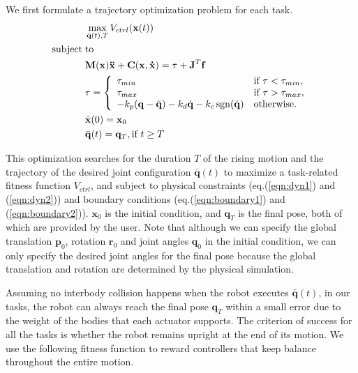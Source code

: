 We first formulate a trajectory optimization problem for each task.
\begin{align}
 \label{eqn:obj}&\max_{\bar{\mathbf{q}}(t),T} V_{ctrl}(\mathbf{x}(t))\\
\nonumber  \mathrm{subject\;} &\mathrm{to} \\
\label{eqn:dyn1} & \mathbf{M}(\mathbf{x})\mathbf{\ddot{x}}+\mathbf{C}(\mathbf{x},\mathbf{\dot{x}}) =\tau + \mathbf{J}^T\mathbf{f}\\
\label{eqn:dyn2} &\tau =
  \left\{
    \begin{array}{ll}
      \tau_{min} & \text{if }\tau < \tau_{min},\\
      \tau_{max} & \text{if }\tau > \tau_{max},\\
      -k_p(\mathbf{q}-\bar{\mathbf{q}}) - k_d\dot{\mathbf{q}} - k_c\operatorname{sgn}(\dot{\mathbf{q}}) & \text{otherwise.}\\
    \end{array}
  \right.\\
\label{eqn:boundary1}&\bar{\mathbf{x}}(0) = \mathbf{x}_0\\
\label{eqn:boundary2}&\bar{\mathbf{q}}(t) = \mathbf{q}_T, \text{if } t \geq T
\end{align}

This optimization searches for the duration $T$ of the rising motion and the trajectory of the desired joint configuration $\bar{\mathbf{q}}(t)$ to maximize a task-related fitness function $V_{ctrl}$, and subject to physical constraints (eq.(\ref{eqn:dyn1}) and (\ref{eqn:dyn2})) and boundary conditions (eq.(\ref{eqn:boundary1}) and (\ref{eqn:boundary2})). $\mathbf{x}_0$ is the initial condition, and $\mathbf{q}_T$ is the final pose, both of which are provided by the user. Note that although we can specify the global translation $\mathbf{p}_0$, rotation $\mathbf{r}_0$ and joint angles $\mathbf{q}_0$ in the initial condition, we can only specify the desired joint angles for the final pose because the global translation and rotation are determined by the physical simulation.

Assuming no interbody collision happens when the robot executes $\bar{\mathbf{q}}(t)$, in our tasks, the robot can always reach the final pose $\mathbf{q}_T$ within a small error due to the weight of the bodies that each actuator supports. The criterion of success for all the tasks is whether the robot remains upright at the end of its motion. We use the following fitness function to reward controllers that keep balance throughout the entire motion.

